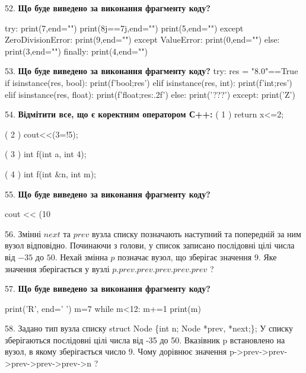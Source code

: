 \documentclass[11pt]{article}
\begin{document}
52. \textbf{Що буде виведено за виконання фрагменту коду?}

try:
    print(7,end="")
    print(8j==7j,end="")
    print(5,end="")
except ZeroDivisionError: print(9,end="")
except ValueError: print(0,end="")
else: print(3,end="")
finally: print(4,end="")
\par\vspace{5mm}

53. \textbf{Що буде виведено за виконання фрагменту коду?}
try:
    res = "8.0"==True
    if isinstance(res, bool):
        print(f'bool;{res}')
    elif isinstance(res, int):
        print(f'int;{res}')
    elif isinstance(res, float):
        print(f'float;{res:.2f}')
    else:
        print('???')
except:
    print('Z')
\par\vspace{5mm}

54. %
\textbf{Відмітити все, що є коректним оператором С++:}
( 1 ) return x<=2;

( 2 ) cout<<(3=!5);

( 3 ) int f(int a, int 4);

( 4 ) int f(int &n, int m);
\par\vspace{5mm}

55. \textbf{Що буде виведено за виконання фрагменту коду?}

cout << (10 %
\par\vspace{5mm}

56. 
Змінні $next$ та $prev$ вузла списку позначають наступний та попередній за ним вузол відповідно. Починаючи з голови, у список записано послідовні цілі числа від $-35$ до $50$. Нехай змінна $p$ позначає вузол, що зберігає значення $9$.
Яке значення зберігається у вузлі $p.prev.prev.prev.prev.prev$ ?
\par\vspace{5mm}

57. \textbf{Що буде виведено за виконання фрагменту коду?}

print('R', end=' ')
m=7
while m<12:
    m+=1
print(m)

\par\vspace{5mm}

58. 
Задано тип вузла списку
struct Node \{int n; Node *prev, *next;\};
У списку зберігаються послідовні цілі числа від -35 до 50. Вказівник p встановлено на вузол, в якому зберігається число 9.
Чому дорівнює значення p->prev->prev->prev->prev->prev->n ?\par\vspace{5mm}
\end{document}
